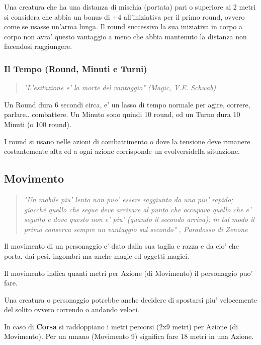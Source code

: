\documentclass[a4paper,11pt,twoside,openany]{book}
\begin{document}
Una creatura che ha una distanza di mischia (portata) pari o superiore
ai 2 metri si considera che abbia un bonus di +4 all'iniziativa per
il primo round, ovvero come se usasse un'arma lunga. Il round successivo
la sua iniziativa in corpo a corpo non avra' questo vantaggio a meno
che abbia mantenuto la distanza non facendosi raggiungere.

\subsubsection{Il Tempo (Round, Minuti e Turni)}

\label{il-tempo-round-minuti-e-turni}
\begin{quote}\textit{
"L'esitazione e' la morte del vantaggio" (Magic, V.E. Schwab)}\end{quote}

Un Round dura 6 secondi circa, e' un lasso di tempo normale per agire, correre, parlare.. combattere. Un Minuto sono quindi 10 round, ed un Turno dura 10 Minuti (o 100 round).

I round si usano nelle azioni di combattimento o dove la tensione deve rimanere costantemente alta ed a ogni azione corrisponde un evolversidella situazione.

\pagebreak

\subsection{Movimento}

\label{movimento}

\begin{quote}\textit{"Un mobile piu' lento non puo' essere raggiunto da uno piu' rapido; giacché quello che segue deve arrivare al punto che occupava quello che e' seguito e dove questo non e' piu' (quando il secondo arriva); in tal modo il primo conserva sempre un vantaggio sul secondo" , Paradosso di Zenone
}\end{quote}

Il movimento di un personaggio e' dato dalla sua taglia e razza e da cio' che porta, dai pesi, ingombri ma anche magie ed oggetti magici.

Il movimento indica quanti metri per Azione (di Movimento) il personaggio puo' fare.

Una creatura o personaggio potrebbe anche decidere di spostarsi piu' velocemente del solito ovvero correndo o andando veloci.

In caso di \textbf{Corsa} si raddoppiano i metri percorsi (2x9 metri) per Azione (di Movimento). Per un umano (Movimento 9) significa fare 18 metri in una Azione.
\end{document}
